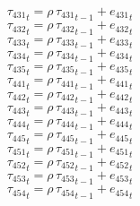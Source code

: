 \begin{dmath}
{{\tau_{431}}}_{t}={{\rho}}\, {{\tau_{431}}}_{t-1}+{{e_{431}}}_{t}
\end{dmath}
\begin{dmath}
{{\tau_{432}}}_{t}={{\rho}}\, {{\tau_{432}}}_{t-1}+{{e_{432}}}_{t}
\end{dmath}
\begin{dmath}
{{\tau_{433}}}_{t}={{\rho}}\, {{\tau_{433}}}_{t-1}+{{e_{433}}}_{t}
\end{dmath}
\begin{dmath}
{{\tau_{434}}}_{t}={{\rho}}\, {{\tau_{434}}}_{t-1}+{{e_{434}}}_{t}
\end{dmath}
\begin{dmath}
{{\tau_{435}}}_{t}={{\rho}}\, {{\tau_{435}}}_{t-1}+{{e_{435}}}_{t}
\end{dmath}
\begin{dmath}
{{\tau_{441}}}_{t}={{\rho}}\, {{\tau_{441}}}_{t-1}+{{e_{441}}}_{t}
\end{dmath}
\begin{dmath}
{{\tau_{442}}}_{t}={{\rho}}\, {{\tau_{442}}}_{t-1}+{{e_{442}}}_{t}
\end{dmath}
\begin{dmath}
{{\tau_{443}}}_{t}={{\rho}}\, {{\tau_{443}}}_{t-1}+{{e_{443}}}_{t}
\end{dmath}
\begin{dmath}
{{\tau_{444}}}_{t}={{\rho}}\, {{\tau_{444}}}_{t-1}+{{e_{444}}}_{t}
\end{dmath}
\begin{dmath}
{{\tau_{445}}}_{t}={{\rho}}\, {{\tau_{445}}}_{t-1}+{{e_{445}}}_{t}
\end{dmath}
\begin{dmath}
{{\tau_{451}}}_{t}={{\rho}}\, {{\tau_{451}}}_{t-1}+{{e_{451}}}_{t}
\end{dmath}
\begin{dmath}
{{\tau_{452}}}_{t}={{\rho}}\, {{\tau_{452}}}_{t-1}+{{e_{452}}}_{t}
\end{dmath}
\begin{dmath}
{{\tau_{453}}}_{t}={{\rho}}\, {{\tau_{453}}}_{t-1}+{{e_{453}}}_{t}
\end{dmath}
\begin{dmath}
{{\tau_{454}}}_{t}={{\rho}}\, {{\tau_{454}}}_{t-1}+{{e_{454}}}_{t}
\end{dmath}
